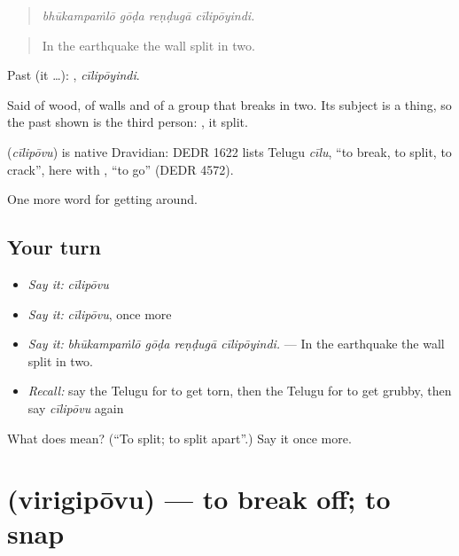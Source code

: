 \begin{quote}
\emph{bhūkampaṁlō gōḍa reṇḍugā cīlipōyindi.}
\end{quote}

\begin{quote}
In the earthquake the wall split in two.
\end{quote}

Past (it …): , \emph{cīlipōyindi}.

Said of wood, of walls and of a group that breaks in two. Its subject is a thing, so the past shown is the third person: , it split.

\begin{cousinweb}
\textbf{} (\emph{cīlipōvu}) is native Dravidian: DEDR 1622 lists Telugu \emph{cīlu}, \textquotedblleft{}to break, to split, to crack\textquotedblright{}, here with , \textquotedblleft{}to go\textquotedblright{} (DEDR 4572).
\end{cousinweb}

\begin{grammarlens}[title={What you've built}]
One more word for getting around.
\end{grammarlens}

\subsection*{Your turn}
\begin{itemize}
\raggedright
  \item \emph{Say it:} \emph{cīlipōvu}
  \item \emph{Say it:} \emph{cīlipōvu}, once more
  \item \emph{Say it:} \emph{bhūkampaṁlō gōḍa reṇḍugā cīlipōyindi.} — In the earthquake the wall split in two.
  \item \emph{Recall:} say the Telugu for to get torn, then the Telugu for to get grubby, then say \emph{cīlipōvu} again
\end{itemize}

\begin{tcolorbox}[breakable,colback=teal!4,colframe=teal!35!black,title={Before you move on}]
What does  mean? (\textquotedblleft{}To split; to split apart\textquotedblright{}.) Say it once more.
\end{tcolorbox}
\section[\texorpdfstring{\te{విరిగిపోవు} (virigipōvu)}{విరిగిపోవు (virigipōvu)}]{ (virigipōvu) — to break off; to snap}

